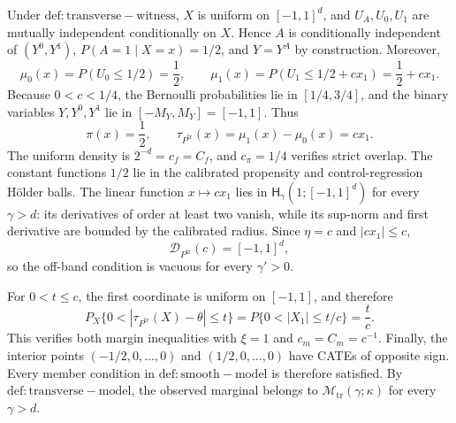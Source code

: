 Under \(\mathrm{def:transverse-witness}\), \(X\) is uniform on \([-1,1]^d\), and \(U_A,U_0,U_1\) are mutually independent conditionally on \(X\). Hence \(A\) is conditionally independent of \((Y^0,Y^1)\), \(P(A=1\mid X=x)=1/2\), and \(Y=Y^A\) by construction. Moreover,
\[
\mu_0(x)=P(U_0\le1/2)=\frac12,
\qquad
\mu_1(x)=P(U_1\le1/2+cx_1)=\frac12+cx_1.
\]
Because \(0<c<1/4\), the Bernoulli probabilities lie in \([1/4,3/4]\), and the binary variables \(Y,Y^0,Y^1\) lie in \([-M_Y,M_Y]=[-1,1]\). Thus
\[
\pi(x)=\frac12,
\qquad
\tau_{P^{\mathrm{tr}}}(x)=\mu_1(x)-\mu_0(x)=cx_1.
\]
The uniform density is \(2^{-d}=c_f=C_f\), and \(c_\pi=1/4\) verifies strict overlap. The constant functions \(1/2\) lie in the calibrated propensity and control-regression Hölder balls. The linear function \(x\mapsto cx_1\) lies in \(\mathsf H_\gamma(1;[-1,1]^d)\) for every \(\gamma>d\): its derivatives of order at least two vanish, while its sup-norm and first derivative are bounded by the calibrated radius. Since \(\eta=c\) and \(|cx_1|\le c\),
\[
\mathcal D_{P^{\mathrm{tr}}}(c)=[-1,1]^d,
\]
so the off-band condition is vacuous for every \(\gamma'>0\).

For \(0<t\le c\), the first coordinate is uniform on \([-1,1]\), and therefore
\[
P_X\{0<|\tau_{P^{\mathrm{tr}}}(X)-\theta|\le t\}
=P\{0<|X_1|\le t/c\}=\frac{t}{c}.
\]
This verifies both margin inequalities with \(\xi=1\) and \(c_m=C_m=c^{-1}\). Finally, the interior points \((-1/2,0,\ldots,0)\) and \((1/2,0,\ldots,0)\) have CATEs of opposite sign. Every member condition in \(\mathrm{def:smooth-model}\) is therefore satisfied. By \(\mathrm{def:transverse-model}\), the observed marginal belongs to \(\mathcal M_{\mathrm{tr}}(\gamma;\kappa)\) for every \(\gamma>d\).